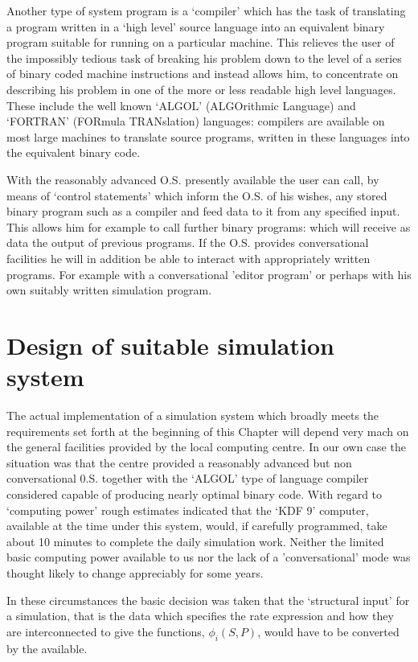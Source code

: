 Another type of system program is a `compiler' which has the task of translating a program written in a `high level' source language into an equivalent binary program suitable for running on a particular machine. This relieves the user of the impossibly tedious task of breaking his problem down to the level of a series of binary coded machine instructions and instead allows him, to concentrate on describing his problem in one of the more or less readable high level languages. These include the well known `ALGOL' (ALGOrithmic Language) and `FORTRAN' (FORmula TRANslation) languages: compilers are available on most large machines to translate source programs, written in these languages into the equivalent binary code.

With the reasonably advanced O.S. presently available the user can call, by means of `control statements' which inform the O.S. of his wishes, any stored binary program such as a compiler and feed data to it from any specified input. This allows him for example to call further binary programs: which will receive as data the output of previous programs. If the O.S. provides conversational facilities he will in addition be able to interact with appropriately written programs. For example with a conversational 'editor program' or perhaps with his own suitably written simulation program.

\section{Design of suitable simulation system}

The actual implementation of a simulation system which broadly meets the requirements set forth at the beginning of this Chapter will depend very mach on the general facilities provided by the local computing centre. In our own case the situation was that the centre provided a reasonably advanced but non conversational 0.S. together with the `ALGOL' type of language compiler considered capable of producing nearly optimal binary code. With regard to `computing power' rough estimates indicated that the `KDF 9' computer, available at the time under this system, would, if carefully programmed, take about 10 minutes to complete the daily simulation work. Neither the limited basic computing power available to us nor the lack of a 'conversational' mode was thought likely to change appreciably for some years.

In these circumstances the basic decision was taken that the `structural input' for a simulation, that is the data which specifies the rate expression and how they are interconnected to give the functions, $\phi_{i}(S, P)$, would have to be converted by the available.

